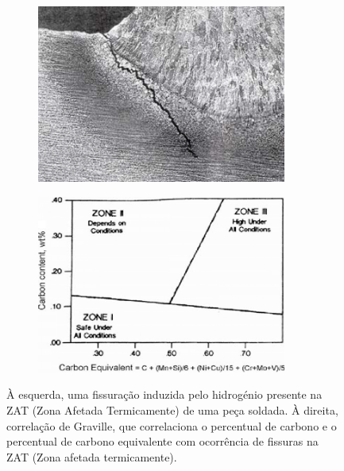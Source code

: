 \begin{figure}[htb]
    \centering
    \begin{subfigure}{.5\textwidth}
        \includegraphics[width = 0.9\textwidth]{Figures/Cap2/Cold_Cracking.png}
        \caption{}
        \label{fig:Fissuracao_1}
    \end{subfigure}%
    \begin{subfigure}{.5\textwidth}
        \centering
        \includegraphics[width = 0.9\textwidth]{Figures/Cap2/Graville_Diagram.png}
        \caption{}
        \label{fig:Graville}
    \end{subfigure}
    \caption[Fissuração induzida por hidrogénio e correlação de Graville]%
    {À esquerda, uma fissuração induzida pelo hidrogénio presente na ZAT (Zona Afetada Termicamente) de uma peça soldada. À direita, correlação de Graville, que correlaciona o percentual de carbono e o percentual de carbono equivalente com ocorrência de fissuras na ZAT (Zona afetada termicamente)\cite{Olson2007}. }
\end{figure}
